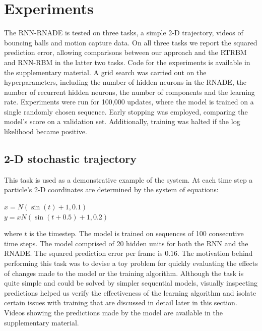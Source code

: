 \documentclass{article} %
\begin{document}
\section{Experiments}
\label{Experiments}
The RNN-RNADE is tested on three tasks, a simple 2-D trajectory, videos of bouncing balls and motion capture data. On all three tasks we report the squared prediction error, allowing comparisons between our approach and the RTRBM and RNN-RBM in the latter two tasks. Code for the experiments is available in the supplementary material.  A grid search was carried out on the hyperparameters, including the number of hidden neurons in the RNADE, the number of recurrent hidden neurons, the number of components and the learning rate. Experiments were run for 100,000 updates, where the model is trained on a single randomly chosen sequence. Early stopping was employed, comparing the model's score on a validation set. Additionally, training was halted if the log likelihood became positive.


\subsection{2-D stochastic trajectory}
This task is used as a demonstrative example of the system. At each time step a particle's 2-D coordinates are determined by the system of equations:

\(x = N(\sin(t)+1,0.1)\)\\
\(y = x N(\sin(t+0.5)+1,0.2)\)

where $t$ is the timestep. The model is trained on sequences of 100 consecutive time steps. The model comprised of 20 hidden units for both the RNN and the RNADE. The squared prediction error per frame is $\mathbf{0.16}$. The motivation behind performing this task was to devise a toy problem for quickly evaluating the effects of changes made to the model or the training algorithm. Although the task is quite simple and could be solved by simpler sequential models, visually inspecting predictions helped us verify the effectiveness of the learning algorithm and isolate certain issues with training that are discussed in detail later in this section. Videos showing the predictions made by the model are available in the supplementary material. 
\end{document}
